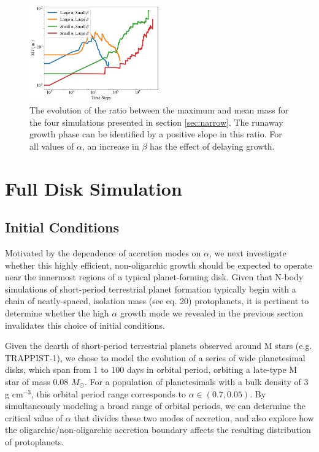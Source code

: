 \documentclass[twocolumn]{aastex63}
\begin{document}
\begin{figure}
\begin{center}
    \includegraphics[width=0.5\textwidth]{figures/alpha_beta_evo.png}
    \caption{The evolution of the ratio between the maximum and mean mass for the four simulations presented in section 
    \ref{sec:narrow}. The runaway growth phase can be identified by a positive slope in this ratio. For all values of $\alpha$, an 
    increase in $\beta$ has the effect of delaying growth.\label{fig:alpha_beta_evo}}
\end{center}
\end{figure}

\section{Full Disk Simulation}\label{sec:fulldisk}

\subsection{Initial Conditions}

Motivated by the dependence of accretion modes on $\alpha$,
we next investigate whether this highly efficient, non-oligarchic
growth should be expected to operate near the innermost regions of a typical planet-forming
disk. Given that N-body simulations of short-period terrestrial planet formation 
typically begin with a chain of neatly-spaced, isolation mass 
(see \citet{kokubo00} eq. 20) protoplanets, it is pertinent to determine 
whether the high $\alpha$ growth mode we revealed
in the previous section invalidates this choice of initial conditions.

Given the dearth of short-period terrestrial planets observed around M stars (e.g. TRAPPIST-1), we chose to model the evolution of a series of wide planetesimal disks, which span from 1 to 100 days in orbital period, orbiting a late-type M star of mass 0.08 $M_{\odot}$. For a population of planetesimals with a bulk density of 3 g cm$^{-3}$, this orbital period range corresponds to $\alpha \in (0.7, 0.05)$. By simultaneously modeling a broad range of orbital periods, we can determine the critical value of $\alpha$ that divides these two modes of accretion, and also explore how the oligarchic/non-oligarchic accretion boundary affects the resulting distribution of protoplanets.
\end{document}
